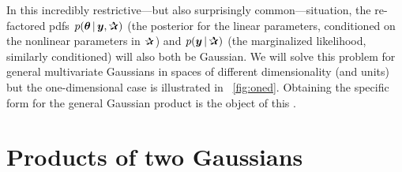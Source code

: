 In this incredibly restrictive---but also surprisingly
common---situation, the re-factored pdfs $p(\vtheta\given\vy,\bP)$
(the posterior for the linear parameters, conditioned on
the nonlinear parameters in $\bP$) and $p(\vy\given\bP)$ (the
marginalized likelihood, similarly conditioned) will also both be Gaussian.
We will solve this problem for general multivariate Gaussians in spaces
of different dimensionality (and units) but the one-dimensional case is
illustrated in \figurename~\ref{fig:oned}.
Obtaining the specific form for the general Gaussian product is the object of this
\documentname.

\section{Products of two Gaussians}\label{sec:problemsolution}

